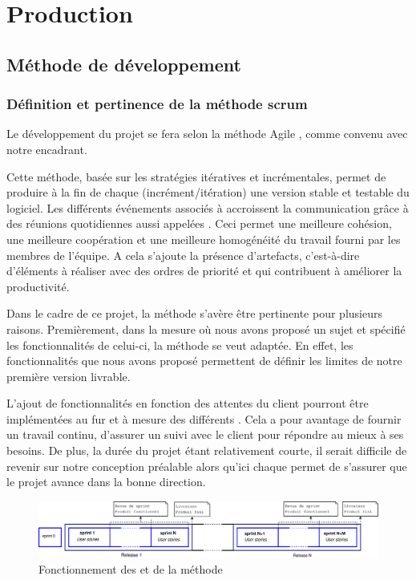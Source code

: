 \chapter{Production}
\section{Méthode de développement}
\subsection{Définition et pertinence de la méthode scrum}
Le développement du projet se fera selon la méthode Agile , comme convenu avec notre encadrant.

Cette méthode, basée sur les stratégies itératives et incrémentales, permet de produire à la fin de chaque  (incrément/itération) une
version stable et testable du logiciel. Les différents événements associés à  accroissent la communication grâce à des réunions quotidiennes
aussi appelées . Ceci permet une meilleure cohésion, une meilleure coopération et une meilleure homogénéité du travail fourni par les
membres de l'équipe. A cela s'ajoute la présence d'artefacts, c'est-à-dire d'éléments à réaliser avec des ordres de priorité et qui contribuent à
améliorer la productivité.
                    
Dans le cadre de ce projet, la méthode  s’avère être pertinente pour plusieurs raisons. 
Premièrement, dans la mesure où nous avons proposé un sujet et spécifié les fonctionnalités de celui-ci, la méthode  se veut adaptée. En effet,
les fonctionnalités que nous avons proposé permettent de définir les limites de notre première version  livrable. 

L'ajout de fonctionnalités en fonction des attentes du client pourront être implémentées au fur et à mesure des différents .  Cela a pour
avantage de fournir un travail continu, d’assurer un suivi avec le client pour répondre au mieux à ses besoins. De plus, la durée du projet étant
relativement courte, il serait difficile de revenir sur notre conception préalable alors qu'ici chaque  permet de s’assurer que le projet
avance dans la bonne direction.

\begin{figure}[H]
	\centering
	\includegraphics[width=18cm]{screens/scrum.eps}
	\caption{Fonctionnement des  et  de la méthode }
\end{figure}


